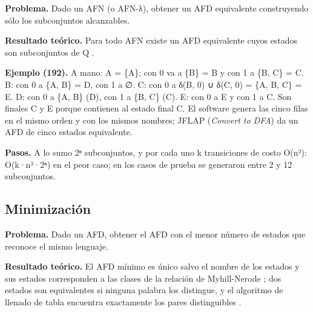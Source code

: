 \textbf{Problema.} Dado un AFN (o AFN-λ), obtener un AFD equivalente construyendo sólo los subconjuntos alcanzables.

\textbf{Resultado teórico.} Para todo AFN existe un AFD equivalente cuyos estados son subconjuntos de Q \autocites[teorema 11]{rabin1959}[sec.~2.3.5, teorema 2.11]{hopcroft2007}.

\begin{Shaded}
\begin{Highlighting}[]
\end{Highlighting}
\end{Shaded}

\textbf{Ejemplo (192).} A mano: A = \{A\}; con 0 va a \{B\} = B y con 1 a \{B, C\} = C. B: con 0 a \{A, B\} = D, con 1 a ∅. C: con 0 a δ(B, 0) ∪ δ(C, 0) = \{A, B, C\} = E. D: con 0 a \{A, B\} (D), con 1 a \{B, C\} (C). E: con 0 a E y con 1 a C. Son finales C y E porque contienen al estado final C. El software genera las cinco filas en el mismo orden y con los mismos nombres; JFLAP (\emph{Convert to DFA}) da un AFD de cinco estados equivalente.

\textbf{Pasos.} A lo sumo 2ⁿ subconjuntos, y por cada uno k transiciones de costo O(n²): O(k·n²·2ⁿ) en el peor caso; en los casos de prueba se generaron entre 2 y 12 subconjuntos.

\hypertarget{minimizaciuxf3n}{%
\subsection{Minimización}\label{minimizaciuxf3n}}

\textbf{Problema.} Dado un AFD, obtener el AFD con el menor número de estados que reconoce el mismo lenguaje.

\textbf{Resultado teórico.} El AFD mínimo es único salvo el nombre de los estados y sus estados corresponden a las clases de la relación de Myhill-Nerode \autocite{nerode1958}; dos estados son equivalentes si ninguna palabra los distingue, y el algoritmo de llenado de tabla encuentra exactamente los pares distinguibles \autocite[sec.~4.4.1--4.4.3]{hopcroft2007}.

